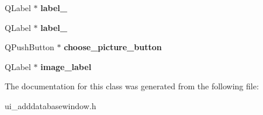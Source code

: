 \begin{DoxyCompactItemize}
Q\+Label $\ast$ {\bfseries label\+\_}
\item 
\mbox{\label{class_ui___add_database_window_aaf675288c2490619b8e27eb50f086d5c}} 
Q\+Label $\ast$ {\bfseries label\+\_}
\item 
\mbox{\label{class_ui___add_database_window_a920969352e23c5287b4eb30301a4935c}} 
Q\+Push\+Button $\ast$ {\bfseries choose\+\_\+picture\+\_\+button}
\item 
\mbox{\label{class_ui___add_database_window_a81c579e917bee2c70f6b61421a5854c0}} 
Q\+Label $\ast$ {\bfseries image\+\_\+label}
\end{DoxyCompactItemize}


The documentation for this class was generated from the following file\+:\begin{DoxyCompactItemize}
\item 
ui\+\_\+adddatabasewindow.\+h\end{DoxyCompactItemize}

